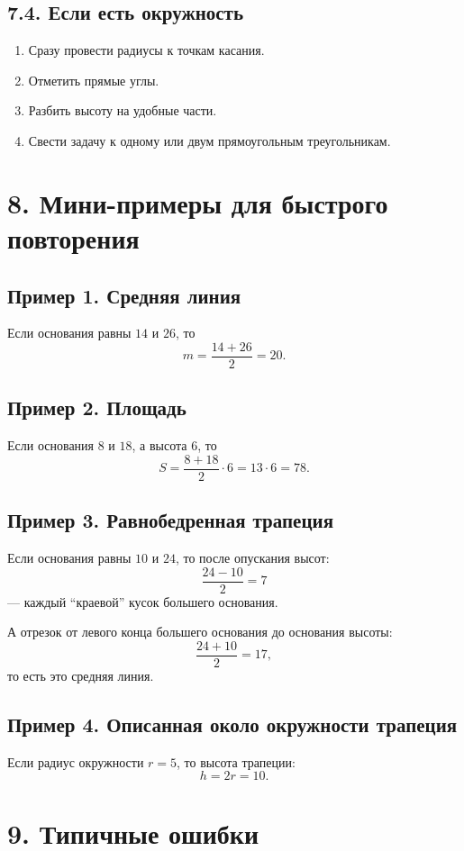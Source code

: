 \documentclass[a4paper,12pt]{article}
\newcommand{\med}{m}
\newcommand{\Area}{S}
\begin{document}
\subsection*{\textcolor{accent}{7.4. Если есть окружность}}
\begin{enumerate}
    \item Сразу провести радиусы к точкам касания.
    \item Отметить прямые углы.
    \item Разбить высоту на удобные части.
    \item Свести задачу к одному или двум прямоугольным треугольникам.
\end{enumerate}

\section*{\textcolor{darkaccent}{8. Мини-примеры для быстрого повторения}}

\subsection*{\textcolor{accent}{Пример 1. Средняя линия}}
Если основания равны $14$ и $26$, то
\[
\med=\frac{14+26}{2}=20.
\]

\subsection*{\textcolor{accent}{Пример 2. Площадь}}
Если основания $8$ и $18$, а высота $6$, то
\[
\Area=\frac{8+18}{2}\cdot 6=13\cdot 6=78.
\]

\subsection*{\textcolor{accent}{Пример 3. Равнобедренная трапеция}}
Если основания равны $10$ и $24$, то после опускания высот:
\[
\frac{24-10}{2}=7
\]
--- каждый ``краевой'' кусок большего основания.

А отрезок от левого конца большего основания до основания высоты:
\[
\frac{24+10}{2}=17,
\]
то есть это средняя линия.

\subsection*{\textcolor{accent}{Пример 4. Описанная около окружности трапеция}}
Если радиус окружности $r=5$, то высота трапеции:
\[
h=2r=10.
\]

\section*{\textcolor{darkaccent}{9. Типичные ошибки}}
\end{document}
